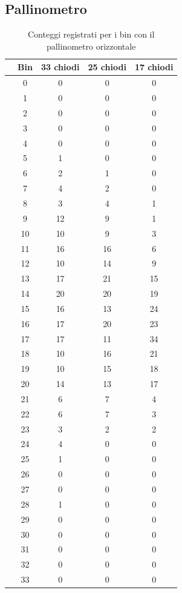 \documentclass[10pt,oneside,a4paper]{article}
\begin{document}
\pagebreak
\subsection{Pallinometro}

\begin{table}[H]
\caption{Conteggi registrati per i bin con il pallinometro orizzontale}
\label{tab:palli_orizzontale}
\centering
\begin{tabular}{ccccc}
  \hline
 & Bin & 33 chiodi & 25 chiodi & 17 chiodi \\ 
  \hline
&0 & 0 & 0 & 0 \\  
&1 & 0 & 0 & 0 \\ 
  &2 & 0 & 0 & 0 \\ 
  &3 & 0 & 0 & 0 \\ 
  &4 & 0 & 0 & 0 \\ 
  &5 & 1 & 0 & 0 \\ 
  &6 & 2 & 1 & 0 \\ 
  &7 & 4 & 2 & 0 \\ 
  &8 & 3 & 4 & 1 \\ 
  &9 & 12 & 9 & 1 \\ 
  &10 & 10 & 9 & 3 \\ 
  &11 & 16 & 16 & 6 \\ 
  &12 & 10 & 14 & 9 \\ 
  &13 & 17 & 21 & 15 \\ 
  &14 & 20 & 20 & 19 \\ 
  &15 & 16 & 13 & 24 \\ 
  &16 & 17 & 20 & 23 \\ 
  &17 & 17 & 11 & 34 \\ 
  &18 & 10 & 16 & 21 \\ 
  &19 & 10 & 15 & 18 \\ 
  &20 & 14 & 13 & 17 \\ 
  &21 & 6 & 7 & 4 \\ 
  &22 & 6 & 7 & 3 \\ 
  &23 & 3 & 2 & 2 \\ 
  &24 & 4 & 0 & 0 \\ 
  &25 & 1 & 0 & 0 \\ 
  &26 & 0 & 0 & 0 \\ 
  &27 & 0 & 0 & 0 \\ 
  &28 & 1 & 0 & 0 \\ 
  &29 & 0 & 0 & 0 \\ 
  &30 & 0 & 0 & 0 \\ 
  &31 & 0 & 0 & 0 \\ 
  &32 & 0 & 0 & 0 \\ 
  &33 & 0 & 0 & 0 \\ 
   \hline
\end{tabular}
\end{table}
\end{document}
